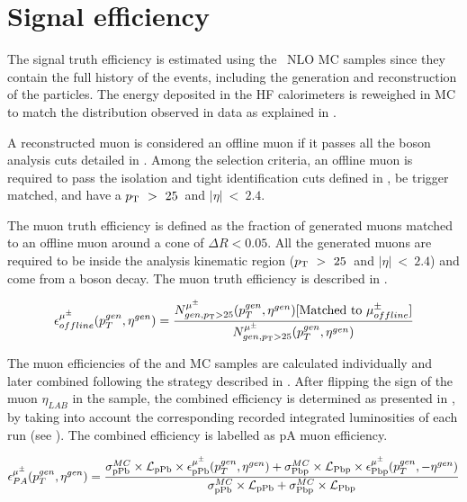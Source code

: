 \section{Signal efficiency}\label{sec:WBoson_Efficiency}

The signal truth efficiency is estimated using the \WToMuNu\ NLO MC samples since they contain the full history of the events, including the generation and reconstruction of the particles. The energy deposited in the HF calorimeters is reweighed in MC to match the distribution observed in data as explained in .

A reconstructed muon is considered an offline muon if it passes all the \W boson analysis cuts detailed in . Among the selection criteria, an offline muon is required to pass the isolation and tight identification cuts defined in , be trigger matched, and have a $p_{\mathrm{T}}~>~25$~\GeVc and $|\eta|~<~2.4$.

The muon truth efficiency is defined as the fraction of generated muons matched to an offline muon around a cone of $\Delta{R} < 0.05$.  All the generated muons are required to be inside the analysis kinematic region ($p_{\mathrm{T}}~>~25$~\GeVc and $|\eta|~<~2.4$) and come from a \W boson decay. The muon truth efficiency is described in .

\begin{equation}
\epsilon^{\mu^{\pm}}_{offline}(p_{T}^{gen} , \eta^{gen}) = \frac{N_{gen,p_{\mathrm{T}}>25}^{\mu^{\pm}}(p_{T}^{gen} , \eta^{gen})[\textnormal{Matched to }\mu_{offline}^{\pm}]}{N_{gen,p_{\mathrm{T}}>25}^{\mu^{\pm}}(p_{T}^{gen} , \eta^{gen})}
\label{eq:MCTruthEfficiency}
\end{equation}

The muon efficiencies of the \RunpPb and \RunPbp MC samples are calculated individually and later combined following the strategy described in . After flipping the sign of the muon $\eta_{LAB}$ in the \RunPbp sample, the combined efficiency is determined as presented in , by taking into account the corresponding recorded integrated luminosities of each run (see ). The combined efficiency is labelled as pA muon efficiency.

\begin{equation}
\epsilon^{\mu^{\pm}}_{PA}(p_{T}^{gen} , \eta^{gen}) = \frac{\sigma^{MC}_{\text{p}\text{Pb}}\times\mathcal{L}_{\text{p}\text{Pb}}\times\epsilon^{\mu^{\pm}}_{\text{p}\text{Pb}}(p_{T}^{gen} , \eta^{gen}) + \sigma^{MC}_{\text{Pb}\text{p}}\times\mathcal{L}_{\text{Pb}\text{p}}\times\epsilon^{\mu^{\pm}}_{\text{Pb}\text{p}}(p_{T}^{gen} , -\eta^{gen})}{\sigma^{MC}_{\text{p}\text{Pb}}\times\mathcal{L}_{\text{p}\text{Pb}} + \sigma^{MC}_{\text{Pb}\text{p}}\times\mathcal{L}_{\text{Pb}\text{p}}}
\label{eq:MCEfficiencyPA}
\end{equation}

